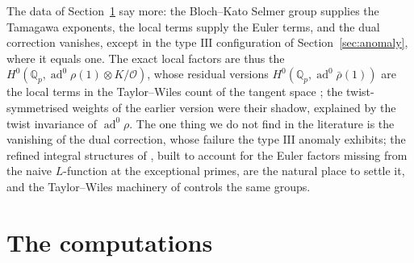 \documentclass[11pt]{amsart}
\theoremstyle{definition}
\newcommand{\Q}{\mathbb{Q}}
\newcommand{\ad}{\operatorname{ad}^0}
\begin{document}
The data of Section~\ref{sec:data} say more: the Bloch--Kato Selmer group supplies the Tamagawa exponents, the local terms supply the Euler terms, and the dual correction vanishes, except in the type $\mathrm{III}$ configuration of Section~\ref{sec:anomaly}, where it equals one. The exact local factors are thus the $H^0(\Q_p,\ad\rho(1)\otimes K/\mathcal{O})$, whose residual versions $H^0(\Q_p,\ad\bar\rho(1))$ are the local terms in the Taylor--Wiles count of the tangent space \cite[Corollary 2.43]{DDT}; the twist-symmetrised weights of the earlier version were their shadow, explained by the twist invariance of $\ad\rho$. The one thing we do not find in the literature is the vanishing of the dual correction, whose failure the type $\mathrm{III}$ anomaly exhibits; the refined integral structures of \cite[\S1.8]{DFG04}, built to account for the Euler factors missing from the naive $L$-function at the exceptional primes, are the natural place to settle it, and the Taylor--Wiles machinery of \cite[\S2]{KimOta} controls the same groups.

\section{The computations}\label{sec:data}
\end{document}

